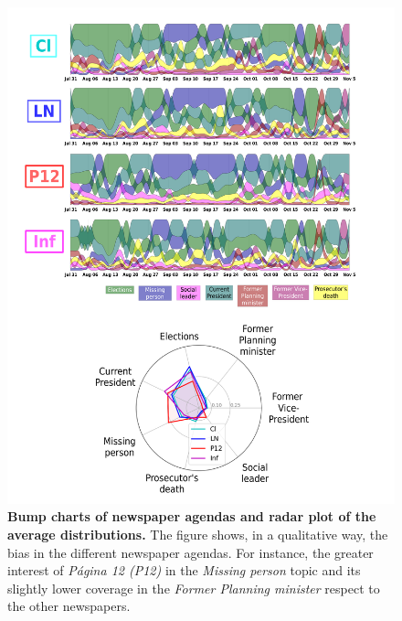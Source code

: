 \documentclass{bmcart}
\begin{document}
\begin{backmatter}
\begin{figure}[h!]
\includegraphics[width = \textwidth]{Fig5.pdf}
\caption{\textbf{Bump charts of newspaper agendas and radar plot of the average distributions.} The figure shows, in a qualitative way, the bias in the different newspaper agendas. For instance, the greater interest of \emph{P\'agina 12 (P12)} in the \emph{Missing person} topic and its slightly lower coverage in the \emph{Former Planning minister} respect to the other newspapers.}
\label{fig:news_agenda}
\end{figure}


\end{backmatter}
\end{document}
